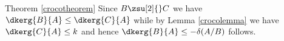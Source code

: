 \begin{proofof}{Theorem \ref{crocotheorem}}
Since $B\zsu[2]{}C$ we have $\dkerg{B}{A}\leq\dkerg{C}{A}$ while
by Lemma \ref{crocolemma} we have $\dkerg{C}{A}\leq k$ and hence
$\dkerg{B}{A}\leq-\delta(A/B)$ follows.%
%
%

\end{proofof}
